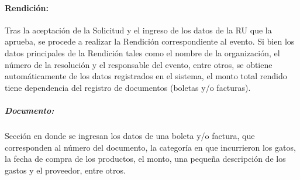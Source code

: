 \paragraph{Rendición: } Tras la aceptación de la Solicitud y el ingreso de los datos de la RU que la aprueba, se procede a realizar la Rendición correspondiente al evento. Si bien los datos principales de la Rendición tales como el nombre de la organización, el número de la resolución y el responsable del evento, entre otros, se obtiene automáticamente de los datos registrados en el sistema, el monto total rendido tiene dependencia del registro de documentos (boletas y/o facturas).

    \subparagraph{\emph{Documento: }} Sección en donde se ingresan los datos de una boleta y/o factura, que corresponden al número del documento, la categoría en que incurrieron los gatos, la fecha de compra de los productos, el monto, una pequeña descripción de los gastos y el proveedor, entre otros.




